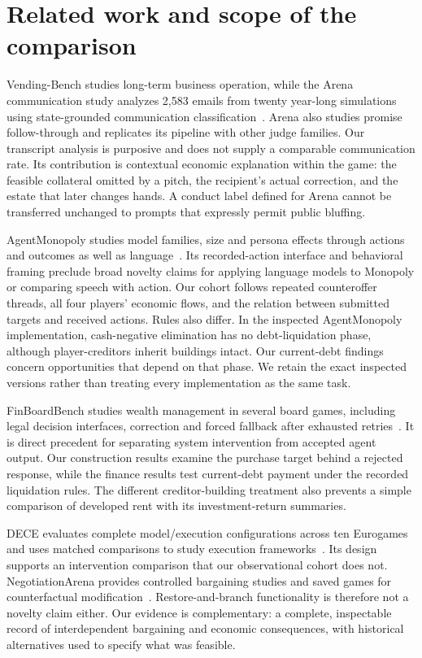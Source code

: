 \section{Related work and scope of the comparison}

Vending-Bench studies long-term business operation, while the Arena communication study analyzes 2,583 emails from twenty year-long simulations using state-grounded communication classification~\cite{backlund2025vendingbench,li2026arena}. Arena also studies promise follow-through and replicates its pipeline with other judge families. Our transcript analysis is purposive and does not supply a comparable communication rate. Its contribution is contextual economic explanation within the game: the feasible collateral omitted by a pitch, the recipient's actual correction, and the estate that later changes hands. A conduct label defined for Arena cannot be transferred unchanged to prompts that expressly permit public bluffing.

AgentMonopoly studies model families, size and persona effects through actions and outcomes as well as language~\cite{wu2026agentmonopoly}. Its recorded-action interface and behavioral framing preclude broad novelty claims for applying language models to Monopoly or comparing speech with action. Our cohort follows repeated counteroffer threads, all four players' economic flows, and the relation between submitted targets and received actions. Rules also differ. In the inspected AgentMonopoly implementation, cash-negative elimination has no debt-liquidation phase, although player-creditors inherit buildings intact. Our current-debt findings concern opportunities that depend on that phase. We retain the exact inspected versions rather than treating every implementation as the same task.

FinBoardBench studies wealth management in several board games, including legal decision interfaces, correction and forced fallback after exhausted retries~\cite{hu2026finboardbench}. It is direct precedent for separating system intervention from accepted agent output. Our construction results examine the purchase target behind a rejected response, while the finance results test current-debt payment under the recorded liquidation rules. The different creditor-building treatment also prevents a simple comparison of developed rent with its investment-return summaries.

DECE evaluates complete model/execution configurations across ten Eurogames and uses matched comparisons to study execution frameworks~\cite{zhang2026dece}. Its design supports an intervention comparison that our observational cohort does not. NegotiationArena provides controlled bargaining studies and saved games for counterfactual modification~\cite{bianchi2024negotiationarena}. Restore-and-branch functionality is therefore not a novelty claim either. Our evidence is complementary: a complete, inspectable record of interdependent bargaining and economic consequences, with historical alternatives used to specify what was feasible.

